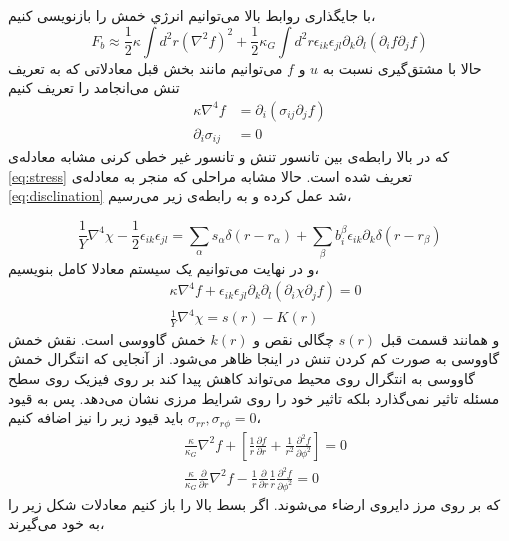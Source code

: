 با جایگذاری روابط بالا می‌توانیم انرژي خمش را بازنویسی کنیم،
\begin{equation}
F_b\approx\frac{1}{2}\kappa\int d^2r(\nabla^2 f)^2+\frac{1}{2}\kappa_G\int d^2r\epsilon_{ik}\epsilon_{jl}\partial_k\partial_l(\partial_if\partial_jf)
\label{eq:bendingenergyequ}
\end{equation}
حالا با مشتق‌گیری نسبت به $u$ و $f$
می‌توانیم مانند بخش قبل معادلاتی که به تعریف تنش می‌انجامد را تعریف کنیم
\begin{equation}
\begin{aligned}
\kappa\nabla^4f&=\partial_i(\sigma_{ij}\partial_jf)\\
\partial_i\sigma_{ij}&=0
\end{aligned}
\end{equation}
که در بالا رابطه‌ی بین تانسور تنش و تانسور غیر خطی کرنی مشابه معادله‌ی 
\ref{eq:stress}
تعریف شده است. حالا مشابه مراحلی که منجر به معادله‌ی 
\ref{eq:disclination}
شد عمل کرده و به رابطه‌ی زیر می‌رسیم،

\begin{equation}
\frac{1}{Y}\nabla^4\chi-\frac{1}{2}\epsilon_{ik}\epsilon_{jl}=\sum_\alpha s_\alpha\delta(r-r_\alpha)+\sum_\beta b_i^\beta\epsilon_{ik}\partial_k\delta(r-r_\beta)
\end{equation}
و در نهایت می‌توانیم یک سیستم معادلا کامل بنویسیم،
\begin{equation}
\begin{aligned}
&\kappa\nabla^4f+\epsilon_{ik}\epsilon_{jl}\partial_k\partial_l(\partial_i\chi\partial_jf)=0\\
&\frac{1}{Y}\nabla^4\chi=s(r)-K(r)
\end{aligned}
\end{equation}
و همانند قسمت قبل $s(r)$ چگالی نقص و 
$k(r)$
خمش گاووسی است. نقش خمش گاووسی به صورت کم کردن تنش در اینجا ظاهر می‌شود. از آنجایی که انتگرال خمش گاووسی به انتگرال روی محیط می‌تواند کاهش پیدا کند بر روی فیزیک روی سطح مسئله تاثیر نمی‌گذارد بلکه تاثیر خود را روی شرایط مرزی نشان می‌دهد. پس به قیود 
$\sigma_{rr},\sigma_{r\phi}=0$
باید قیود زیر را نیز اضافه کنیم،
\begin{equation}
\begin{aligned}
&\frac{\kappa}{\kappa_G}\nabla^2f+\left[\frac{1}{r}\frac{\partial f}{\partial r}+\frac{1}{r^2}\frac{\partial^2 f}{\partial\phi^2}\right]=0\\
&\frac{\kappa}{\kappa_G}\frac{\partial}{\partial r}\nabla^2f-\frac{1}{r}\frac{\partial}{\partial r}\frac{1}{r}\frac{\partial^2 f}{\partial\phi^2}=0
\end{aligned}
\end{equation}
که بر روی مرز دایروی ارضاء می‌شوند. اگر بسط بالا را باز کنیم معادلات شکل زیر را به خود می‌گیرند،

